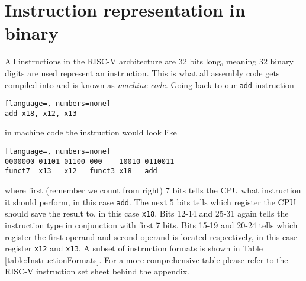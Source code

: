\section{Instruction representation in binary}
    All instructions in the RISC-V architecture are 32 bits long, meaning 32 binary digits are used represent an instruction. This is what all assembly code gets compiled into and is known as \textit{machine code}.
    Going back to our \texttt{add} instruction 
    \begin{lstlisting}[language=, numbers=none]
add x18, x12, x13
    \end{lstlisting}
    in machine code the instruction would look like
    \begin{lstlisting}[language=, numbers=none]
0000000 01101 01100 000    10010 0110011
funct7  x13   x12   funct3 x18   add
    \end{lstlisting}
    where first (remember we count from right) 7 bits tells the CPU what instruction it should perform, in this case \texttt{add}. The next 5 bits tells which register the CPU should save the result to, in this case \texttt{x18}. Bits 12-14 and 25-31 again tells the instruction type in conjunction with first 7 bits. Bits 15-19 and 20-24 tells which register the first operand and second operand is located respectively, in this case register \texttt{x12} and \texttt{x13}. A subset of instruction formats is shown in Table \ref{table:InstructionFormats}. For a more comprehensive table please refer to the RISC-V instruction set sheet behind the appendix.
    
